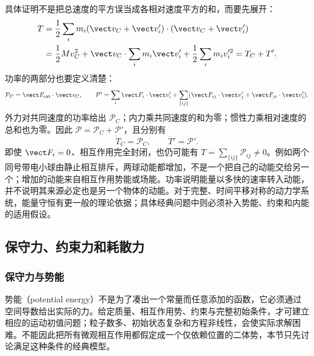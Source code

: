 具体证明不是把总速度的平方误当成各相对速度平方的和，而要先展开：
\[
\begin{aligned}
 T&=\frac12\sum_i m_i(\vect v_C+\vect v_i')\cdot(\vect v_C+\vect v_i')\\
  &=\frac12Mv_C^2+\vect v_C\cdot\sum_i m_i\vect v_i'
    +\frac12\sum_i m_iv_i'^2=T_C+T'.
\end{aligned}
\]
功率的两部分也要定义清楚：
\[
 \mathcal P_C=\vect F_{\rm ext}\cdot\vect v_C,\qquad
 \mathcal P'=\sum_i\vect F_i\cdot\vect v_i'
 +\sum_{\{ij\}}(\vect F_{ij}\cdot\vect v_j'+\vect F_{ji}\cdot\vect v_i').
\]
外力对共同速度的功率给出 $\mathcal P_C$；内力乘共同速度的和为零；惯性力乘相对速度的总和也为零。因此 $\mathcal P=\mathcal P_C+\mathcal P'$，且分别有
\[
 \dot T_C=\mathcal P_C,\qquad \dot T'=\mathcal P'.
\]
即使 $\vect F_i=0$、相互作用完全封闭，也仍可能有 $\dot T=\sum_{\{ij\}}\mathcal P_{ij}\ne0$。例如两个同号带电小球由静止相互排斥，两球动能都增加，不是一个把自己的动能交给另一个；增加的动能来自相互作用势能或场能。功率说明能量以多快的速率转入动能，并不说明其来源必定也是另一个物体的动能。对于完整、时间平移对称的动力学系统，能量守恒有更一般的理论依据；具体经典问题中则必须补入势能、约束和内能的适用假设。

\subsection{保守力、约束力和耗散力}
\label{r2ch02:sec:other-energy}

\subsubsection{保守力与势能}
\label{r2ch02:sec:conservative}

势能（potential energy）不是为了凑出一个常量而任意添加的函数，它必须通过空间导数给出实际的力。给定质量、相互作用势、约束与完整初始条件，才可建立相应的运动初值问题；粒子数多、初始状态复杂和方程非线性，会使实际求解困难。不能因此把所有微观相互作用都假定成一个仅依赖位置的二体势，本节只先讨论满足这种条件的经典模型。

